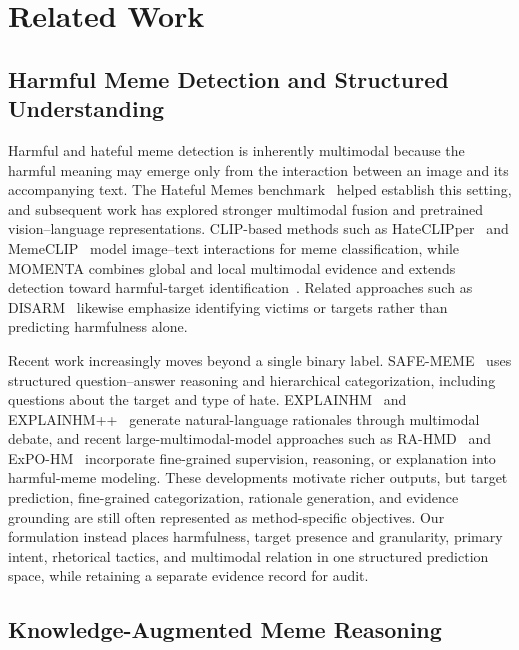 \section{Related Work}
\label{sec:related_work}

\subsection{Harmful Meme Detection and Structured Understanding}
\label{sec:related:detection}

Harmful and hateful meme detection is inherently multimodal because the
harmful meaning may emerge only from the interaction between an image and
its accompanying text.
The Hateful Memes benchmark~\cite{kiela2020hateful} helped establish this setting, and subsequent
work has explored stronger multimodal fusion and pretrained
vision--language representations.
CLIP-based methods such as HateCLIPper~\cite{kumar2022hateclipper} and
MemeCLIP~\cite{shah2024memeclip} model image--text
interactions for meme classification, while MOMENTA combines global and
local multimodal evidence and extends detection toward harmful-target
identification~\cite{pramanick2021momenta}.
Related approaches such as DISARM~\cite{sharma2022disarm} likewise emphasize identifying victims
or targets rather than predicting harmfulness alone.

Recent work increasingly moves beyond a single binary label.
SAFE-MEME~\cite{nandi2024safememe} uses structured question--answer reasoning and hierarchical
categorization, including questions about the target and type of hate.
EXPLAINHM~\cite{lin2024explainhm} and
EXPLAINHM++~\cite{lin2026explainhmpp} generate natural-language rationales through
multimodal debate, and recent large-multimodal-model approaches such as
RA-HMD~\cite{mei2025rahmd} and ExPO-HM~\cite{mei2026expohm} incorporate fine-grained supervision, reasoning, or
explanation into harmful-meme modeling.
These developments motivate richer outputs, but target prediction,
fine-grained categorization, rationale generation, and evidence grounding
are still often represented as method-specific objectives.
Our formulation instead places harmfulness, target presence and
granularity, primary intent, rhetorical tactics, and multimodal relation in
one structured prediction space, while retaining a separate evidence record
for audit.

\subsection{Knowledge-Augmented Meme Reasoning}
\label{sec:related:knowledge}

